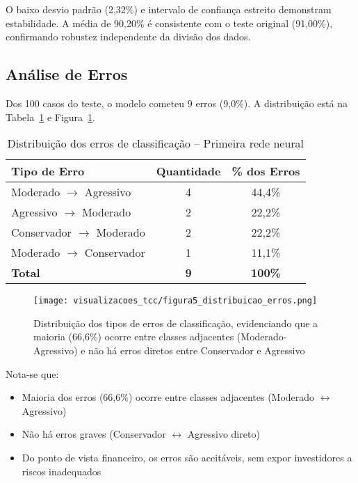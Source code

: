 O baixo desvio padrão (2,32\%) e intervalo de confiança estreito demonstram estabilidade. A média de 90,20\% é consistente com o teste original (91,00\%), confirmando robustez independente da divisão dos dados.

\subsection{Análise de Erros}

Dos 100 casos do teste, o modelo cometeu 9 erros (9,0\%). A distribuição está na Tabela~\ref{tab:analise_erros_primeira_rede} e Figura~\ref{fig:distribuicao_erros}.

\begin{table}[htbp]
\centering
\caption{Distribuição dos erros de classificação -- Primeira rede neural}
\label{tab:analise_erros_primeira_rede}
\begin{tabular}{@{}lcc@{}}
\toprule
\textbf{Tipo de Erro} & \textbf{Quantidade} & \textbf{\% dos Erros} \\ \midrule
Moderado $\rightarrow$ Agressivo & 4 & 44,4\% \\
Agressivo $\rightarrow$ Moderado & 2 & 22,2\% \\
Conservador $\rightarrow$ Moderado & 2 & 22,2\% \\
Moderado $\rightarrow$ Conservador & 1 & 11,1\% \\ \midrule
\textbf{Total} & \textbf{9} & \textbf{100\%} \\ \bottomrule
\end{tabular}
\end{table}

\begin{figure}[htbp]
    \centering
    \texttt{[image: visualizacoes\_tcc/figura5\_distribuicao\_erros.png]}
    \caption{Distribuição dos tipos de erros de classificação, evidenciando que a maioria (66,6\%) ocorre entre classes adjacentes (Moderado-Agressivo) e não há erros diretos entre Conservador e Agressivo}
    \label{fig:distribuicao_erros}
\end{figure}

Nota-se que:
\begin{itemize}
    \item Maioria dos erros (66,6\%) ocorre entre classes adjacentes (Moderado $\leftrightarrow$ Agressivo)
    \item Não há erros graves (Conservador $\leftrightarrow$ Agressivo direto)
    \item Do ponto de vista financeiro, os erros são aceitáveis, sem expor investidores a riscos inadequados
\end{itemize}

